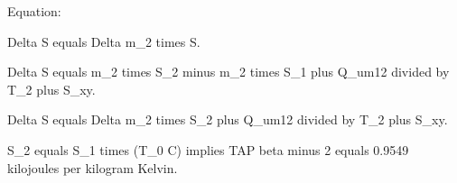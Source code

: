 Equation:

Delta S equals Delta m_2 times S.

Delta S equals m_2 times S_2 minus m_2 times S_1 plus Q_um12 divided by T_2 plus S_xy.

Delta S equals Delta m_2 times S_2 plus Q_um12 divided by T_2 plus S_xy.

S_2 equals S_1 times (T_0 C) implies TAP beta minus 2 equals 0.9549 kilojoules per kilogram Kelvin.